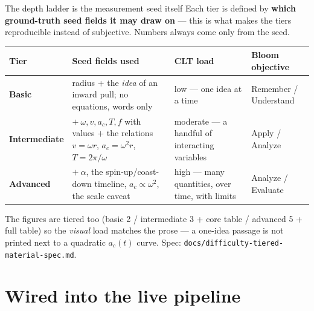 \documentclass[aspectratio=169,10pt]{beamer}
\begin{document}
\begin{frame}{The depth ladder is the measurement seed itself}
\scriptsize
Each tier is defined by \textbf{which ground-truth seed fields it may draw on} --- this is what
makes the tiers reproducible instead of subjective. Numbers always come only from the seed.
\vspace{0.3em}
\renewcommand{\arraystretch}{1.25}
\begin{tabular}{@{}p{1.6cm}p{4.3cm}p{2.2cm}p{2.6cm}@{}}
\toprule
\textbf{Tier} & \textbf{Seed fields used} & \textbf{CLT load} & \textbf{Bloom objective} \\
\midrule
\rowcolor{cBasic!10}\textbf{\color{cBasic}Basic} & radius + the \emph{idea} of an inward pull;
no equations, words only & low --- one idea at a time & Remember / Understand \\
\rowcolor{cInter!10}\textbf{\color{cInter}Intermediate} & $+\ \omega, v, a_c, T, f$ with values
$+$ the relations $v{=}\omega r$, $a_c{=}\omega^2 r$, $T{=}2\pi/\omega$ & moderate --- a handful
of interacting variables & Apply / Analyze \\
\rowcolor{cAdv!10}\textbf{\color{cAdv}Advanced} & $+\ \alpha$, the spin-up/coast-down timeline,
$a_c \propto \omega^2$, the scale caveat & high --- many quantities, over time, with limits &
Analyze / Evaluate \\
\bottomrule
\end{tabular}
\vspace{0.5em}

{\footnotesize The figures are tiered too (basic 2 / intermediate 3 + core table / advanced 5 +
full table) so the \emph{visual} load matches the prose --- a one-idea passage is not printed next
to a quadratic $a_c(t)$ curve. Spec: \texttt{docs/difficulty-tiered-material-spec.md}.}
\end{frame}

\section{Wired into the live pipeline}
\end{document}
